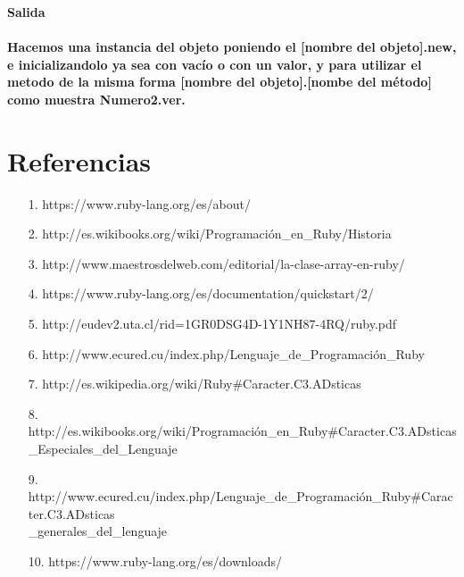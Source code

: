 \documentclass[11pt]{article} %
\begin{document}
\begin{itemize}
\bf Salida\\\\
Hacemos una instancia del objeto poniendo el [nombre del objeto].new, e inicializandolo ya sea con vacío o con un valor, y para utilizar el metodo de la misma forma [nombre del objeto].[nombe del método] como muestra Numero2.ver.\\


\end{itemize}

\newpage
\section{\fontsize{14}{0} \bf Referencias}
\begin{itemize}
          \item [1.] https://www.ruby-lang.org/es/about/ \\
          \item [2.] http://es.wikibooks.org/wiki/Programación\_en\_Ruby/Historia\\
	\item[3.]  http://www.maestrosdelweb.com/editorial/la-clase-array-en-ruby/\\
	\item[4.] https://www.ruby-lang.org/es/documentation/quickstart/2/\\
	\item[5.] http://eudev2.uta.cl/rid=1GR0DSG4D-1Y1NH87-4RQ/ruby.pdf\\
	\item[6.] http://www.ecured.cu/index.php/Lenguaje\_de\_Programación\_Ruby\\
	\item[7.]  http://es.wikipedia.org/wiki/Ruby\#Caracter.C3.ADsticas \\
	\item[8.]  http://es.wikibooks.org/wiki/Programación\_en\_Ruby\#Caracter.C3.ADsticas\\
\_Especiales\_del\_Lenguaje \\
	 \item[9.] http://www.ecured.cu/index.php/Lenguaje\_de\_Programación\_Ruby\#Caracter.C3.ADsticas\\
\_generales\_del\_lenguaje \\
	\item[10.] https://www.ruby-lang.org/es/downloads/

\end{itemize}
\end{document}

